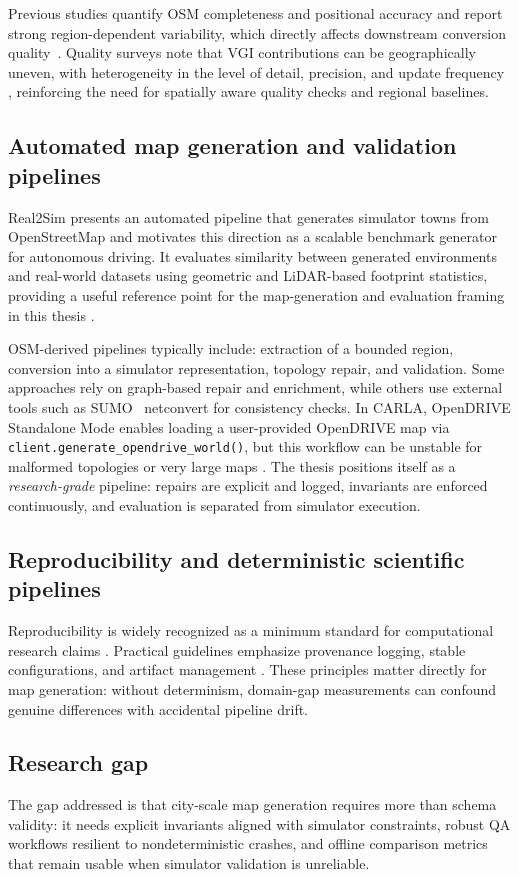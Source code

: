 Previous studies quantify OSM completeness and positional accuracy and report strong region-dependent variability, which directly affects downstream conversion quality~\cite{haklay2008osm,girres2010osm_quality,barron2014osm,goodchild1997positional}.  Quality surveys note that VGI contributions can be geographically uneven, with heterogeneity in the level of detail, precision, and update frequency \cite{senaratne2017vgi}, reinforcing the need for spatially aware quality checks and regional baselines.

\subsection{Automated map generation and validation pipelines}
Real2Sim presents an automated pipeline that generates simulator towns from OpenStreetMap and motivates this direction as a scalable benchmark generator for autonomous driving. It evaluates similarity between generated environments and real-world datasets using geometric and LiDAR-based footprint statistics, providing a useful reference point for the map-generation and evaluation framing in this thesis \cite{real2sim2020}.

OSM-derived pipelines typically include: extraction of a bounded region, conversion into a simulator representation, topology repair, and validation. Some approaches rely on graph-based repair and enrichment, while others use external tools such as SUMO~\cite{behrisch2011sumo,krajzewicz2012sumo} netconvert for consistency checks. In CARLA, OpenDRIVE Standalone Mode enables loading a user-provided OpenDRIVE map via \texttt{client.generate\_opendrive\_world()}, but this workflow can be unstable for malformed topologies or very large maps \cite{carla_opendrive_standalone}. The thesis positions itself as a \emph{research-grade} pipeline: repairs are explicit and logged, invariants are enforced continuously, and evaluation is separated from simulator execution.

\subsection{Reproducibility and deterministic scientific pipelines}
Reproducibility is widely recognized as a minimum standard for computational research claims \cite{peng2011reproducible}. Practical guidelines emphasize provenance logging, stable configurations, and artifact management \cite{sandve2013reproducible}. These principles matter directly for map generation: without determinism, domain-gap measurements can confound genuine differences with accidental pipeline drift.

\subsection{Research gap}
The gap addressed is that city-scale map generation requires more than schema validity: it needs explicit invariants aligned with simulator constraints, robust QA workflows resilient to nondeterministic crashes, and offline comparison metrics that remain usable when simulator validation is unreliable.
